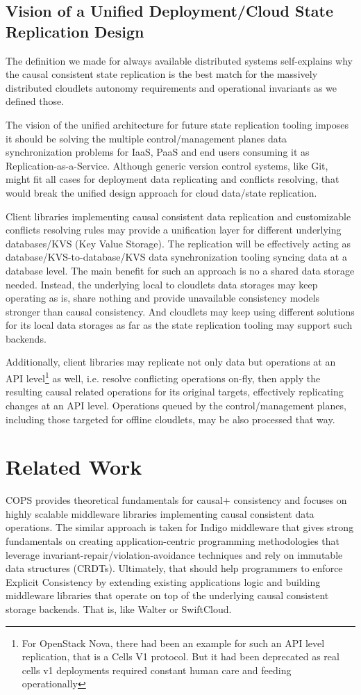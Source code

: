 \documentclass[conference]{IEEEtran}
\begin{document}
\subsection{Vision of a Unified Deployment/Cloud State Replication Design}
The definition we made for always available distributed systems self-explains
why the causal consistent state replication is the best match for the
massively distributed cloudlets autonomy requirements and operational
invariants as we defined those.

The vision of the unified architecture for future state replication tooling
imposes it should be solving the multiple control/management planes data
synchronization problems for IaaS, PaaS and end users consuming it as
Replication-as-a-Service. Although generic version control systems, like Git,
might fit all cases for deployment data replicating and conflicts resolving,
that would break the unified design approach for cloud data/state replication.

Client libraries implementing causal consistent data replication and
customizable conflicts resolving rules may provide a unification layer for
different underlying databases/KVS (Key Value Storage). The replication will be
effectively acting as database/KVS-to-database/KVS data synchronization tooling
syncing data at a database level. The main benefit for such an approach is no a
shared data storage needed. Instead, the underlying local to cloudlets data
storages may keep operating as is, share nothing and provide unavailable
consistency models stronger than causal consistency. And cloudlets may keep
using different solutions for its local data storages as far as the state
replication tooling may support such backends.

Additionally, client libraries may replicate not only data but operations at an
API level\footnote{For OpenStack Nova, there had been an example for such an
API level replication, that is a Cells V1 protocol. But it had been deprecated
as real cells v1 deployments required constant human care and feeding
operationally} as well, i.e. resolve conflicting operations on-fly, then apply
the resulting causal related operations for its original targets, effectively
replicating changes at an API level. Operations queued by the
control/management planes, including those targeted for offline cloudlets, may
be also processed that way.

\section{Related Work}
COPS\cite{b1} provides theoretical fundamentals for causal+ consistency and
focuses on highly scalable middleware libraries implementing causal consistent
data operations. The similar approach is taken for Indigo middleware\cite{b10}
that gives strong fundamentals on creating application-centric programming
methodologies that leverage invariant-repair/violation-avoidance techniques and
rely on immutable data structures (CRDTs). Ultimately, that should help
programmers to enforce Explicit Consistency by extending existing applications
logic and building middleware libraries that operate on top of the underlying
causal consistent storage backends. That is, like Walter\cite{b11} or
SwiftCloud\cite{b12}.
\end{document}
